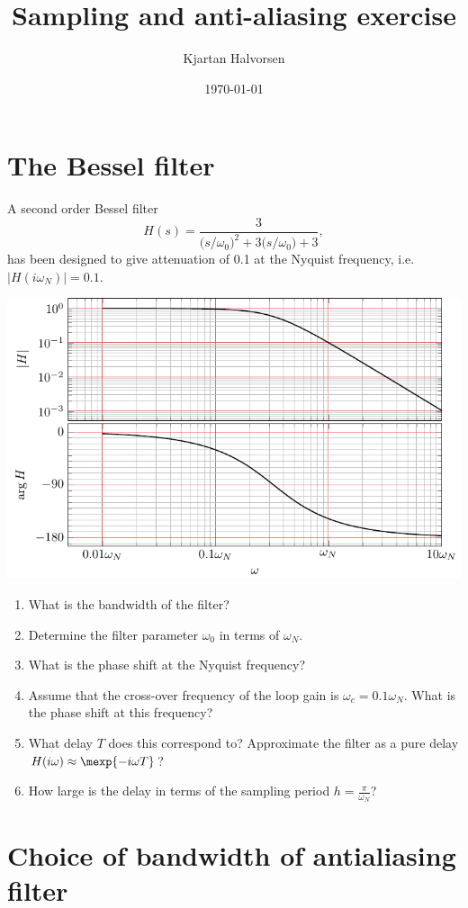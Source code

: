 \documentclass[letterpaper]{scrartcl}
\author{Kjartan Halvorsen}
\date{\today}
\title{Sampling and anti-aliasing exercise}
\begin{document}
\maketitle

\section*{The Bessel filter}
\label{sec-1}
  A second order Bessel filter
\[ H(s) = \frac{3}{\big(s/\omega_0\big)^2 + 3\big(s/\omega_0\big) + 3}, \]
has been designed to give attenuation of 0.1 at the Nyquist frequency, i.e. \(|H(i\omega_N)| = 0.1\).

\begin{center}
\includegraphics[width=0.8\linewidth]{../figures/ps7-bessel-bode}
\end{center}

\begin{enumerate}
\item What is the bandwidth of the filter?
\item Determine the filter parameter \(\omega_0\) in terms of \(\omega_N\).
\item What is the phase shift at the Nyquist frequency?
\item Assume that the cross-over frequency of the loop gain is \(\omega_c = 0.1\omega_N\). What is the phase shift at this frequency?
\item What delay $T$  does this correspond to? Approximate the filter as a pure delay \(H(i\omega) \approx \mexp{-i\omega T}\)?
\item How large is the delay in terms of the sampling period \(h = \frac{\pi}{\omega_N}\)?
\end{enumerate}


\section*{Choice of bandwidth of antialiasing filter}
\label{sec-2}
\end{document}
